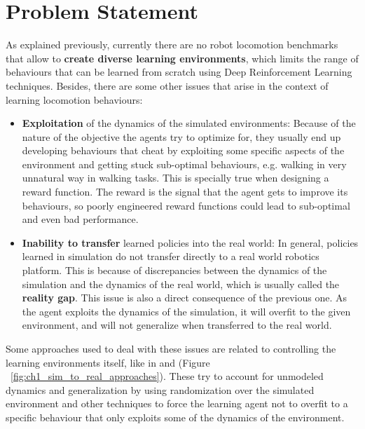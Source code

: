 \section{Problem Statement}
\label{sec:problem}

As explained previously, currently there are no robot locomotion benchmarks that allow
to \textbf{create diverse learning environments}, which limits the range of behaviours that can be learned
from scratch using Deep Reinforcement Learning techniques. Besides, there are some other issues 
that arise in the context of learning locomotion behaviours:

\begin{itemize}
    \item \textbf{Exploitation} of the dynamics of the simulated environments: 
            Because of the nature of the objective the agents try to optimize for, they usually
            end up developing behaviours that cheat by exploiting some specific aspects of the environment
            and getting stuck sub-optimal behaviours, e.g. walking in very unnatural way in walking tasks.
            This is specially true when designing a reward function. The reward is the signal
            that the agent gets to improve its behaviours, so poorly engineered reward functions could lead to sub-optimal and even bad performance.
    \item \textbf{Inability to transfer} learned  policies into the real world:
            In general, policies learned in simulation do not transfer directly to a real world robotics
            platform. This is because of discrepancies between the dynamics of the simulation and
            the dynamics of the real world, which is usually called the \textbf{reality gap}.
            This issue is also a direct consequence of the previous one. As the agent exploits the 
            dynamics of the simulation, it will overfit to the given environment, and will 
            not generalize when transferred to the real world.
\end{itemize}

Some approaches used to deal with these issues are related to controlling the learning 
environments itself, like in \citeauthor{GoogleBrainSim2Real} and \citeauthor{OpenAISim2real} (Figure ~\ref{fig:ch1_sim_to_real_approaches}).
These try to account for unmodeled dynamics and generalization by using randomization
over the simulated environment and other techniques to force the learning agent not to 
overfit to a specific behaviour that only exploits some of the dynamics of the environment.

